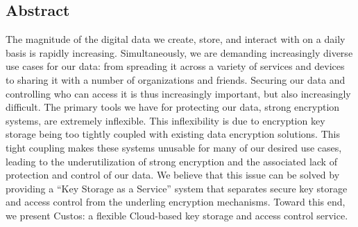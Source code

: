 \subsection*{Abstract}

The magnitude of the digital data we create, store, and interact with
on a daily basis is rapidly increasing. Simultaneously, we are
demanding increasingly diverse use cases for our data: from spreading
it across a variety of services and devices to sharing it with a
number of organizations and friends. Securing our data and controlling
who can access it is thus increasingly important, but also
increasingly difficult. The primary tools we have for protecting our
data, strong encryption systems, are extremely inflexible. This
inflexibility is due to encryption key storage being too tightly
coupled with existing data encryption solutions. This tight coupling
makes these systems unusable for many of our desired use cases,
leading to the underutilization of strong encryption and the
associated lack of protection and control of our data. We believe that
this issue can be solved by providing a ``Key Storage as a Service''
system that separates secure key storage and access control from the
underling encryption mechanisms. Toward this end, we present Custos: a
flexible Cloud-based key storage and access control service.
